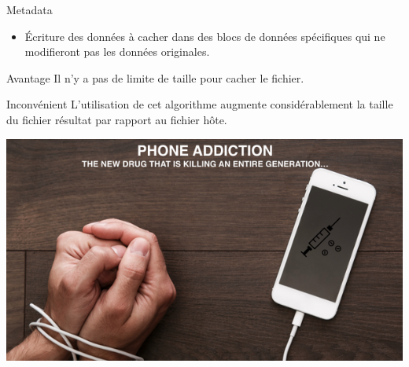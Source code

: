 \documentclass{beamer}
\begin{document}
    \begin{frame}
    
	\begin{block}{Metadata}
	\begin{itemize}
	[circle]
	\item Écriture des données à cacher dans des blocs de données spécifiques 
	qui ne modifieront pas les données originales. 
	\end{itemize}
	\end{block}
	
	\begin{exampleblock}{Avantage} 
	Il n'y a pas de limite de taille pour cacher le fichier. 
	\end{exampleblock}
	
	\begin{alertblock}{Inconvénient} 
	L'utilisation de cet algorithme augmente considérablement la taille du 
	fichier résultat par rapport au fichier hôte. 
	\end{alertblock}
	
	\hspace{3.5cm}
    \includegraphics[scale=0.2]{ANGS3/addiction.png}
    
    \end{frame}
    
\end{document}
